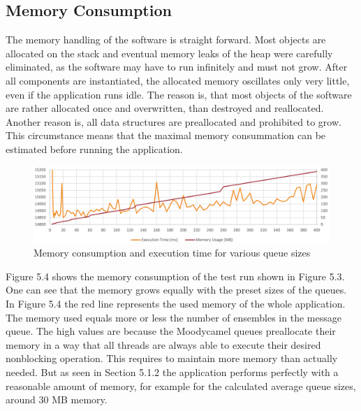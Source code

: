 \subsection{Memory Consumption}
The memory handling of the software is straight forward. Most objects are allocated on the stack and eventual memory leaks of the heap were carefully eliminated, as the software may have to run infinitely and must not grow. After all components are instantiated, the allocated memory oscillates only very little, even if the application runs idle. The reason is, that most objects of the software are rather allocated once and overwritten, than destroyed and reallocated. Another reason is, all data structures are preallocated and prohibited to grow. This circumstance means that the maximal memory consummation can be estimated before running the application.\\
\begin{figure}[h]
\centering
      \includegraphics[width=1\textwidth]{perf_mem_2}
        \caption{Memory consumption and execution time for various queue sizes}
\end{figure}

Figure 5.4 shows the memory consumption of the test run shown in Figure 5.3. One can see that the memory grows equally with the preset sizes of the queues. 
In Figure 5.4 the red line represents the used memory of the whole application. The memory used equals more or less the number of ensembles in the  message queue. The high values are because the Moodycamel queues preallocate their memory in a way that all threads are always able to execute their desired nonblocking operation. This requires to maintain more memory than actually needed. But as seen in Section 5.1.2 the application performs perfectly with a reasonable amount of memory, for example for the calculated average queue sizes, around 30 MB memory.

